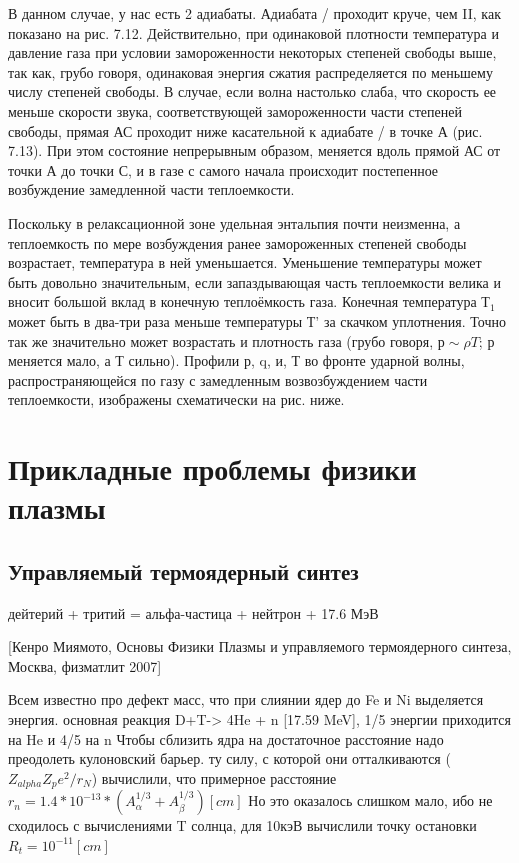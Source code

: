 \documentclass[10pt, a4paper]{article}
\numberwithin{equation}{section}
\begin{document}
В данном случае, у нас есть 2 адиабаты. Адиабата / проходит круче, чем II, как показано на рис. 7.12. Действительно, при одинаковой плотности температура и давление газа при 
условии замороженности некоторых степеней свободы выше, так как, грубо говоря, одинаковая энергия сжатия распределяется по меньшему числу степеней свободы.
В случае, если волна настолько слаба, что скорость ее меньше скорости звука, соответствующей замороженности части степеней свободы, прямая АС проходит ниже касательной к адиабате / в точке А (рис. 7.13). При этом состояние непрерывным образом, меняется вдоль прямой АС от точки А до точки С, и в газе с самого начала происходит постепенное возбуждение замедленной части теплоемкости. 

Поскольку в релаксационной зоне удельная энтальпия почти неизменна, а теплоемкость по мере возбуждения ранее замороженных степеней свободы возрастает, температура в ней уменьшается. Уменьшение температуры может быть довольно значительным, если запаздывающая часть теплоемкости велика и вносит большой вклад в конечную теплоёмкость газа. Конечная температура $Т_1$ может быть в два-три раза меньше температуры Т' за скачком уплотнения. Точно так же значительно может возрастать и плотность газа (грубо говоря, $р \sim \rho T$; р меняется мало, а Т сильно). Профили р, q, и, Т во фронте ударной волны, распространяющейся по газу с замедленным возвозбуждением части теплоемкости, изображены схематически на рис. ниже. 




\section{Прикладные проблемы физики плазмы}
\label{sec.14}


\subsection{Управляемый термоядерный синтез}
\label{14}

дейтерий + тритий = альфа-частица + нейтрон + 17.6 МэВ

[Кенро Миямото, Основы Физики Плазмы и управляемого термоядерного синтеза, Москва, физматлит 2007]

Всем известно про дефект масс, что при слиянии ядер до Fe и Ni выделяется энергия.
основная реакция D+T-> 4He + n [17.59 MeV], 1/5 энергии приходится на He и 4/5 на n
Чтобы сблизить ядра на достаточное расстояние надо преодолеть кулоновский барьер. ту силу, с которой они отталкиваются ($Z_{alpha}Z_p e^2/r_N$) вычислили, что примерное расстояние $r_{n}=1.4*10^{-13}*(A^{1/3}_{\alpha}+A^{1/3}_{\beta}) [cm]$ Но это оказалось слишком мало, ибо не сходилось с вычислениями T солнца, для 10кэВ вычислили точку остановки $R_t=10^{-11} [cm]$
\end{document}
